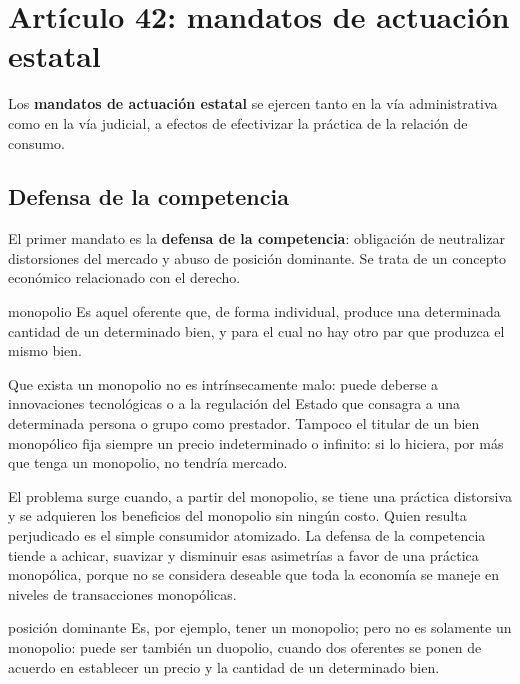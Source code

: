 \documentclass[12pt,oneside]{book}
\begin{document}
\chapter{Art\'iculo 42: mandatos de actuaci\'on estatal}

Los \textbf{mandatos de actuaci\'on estatal} se ejercen tanto en la v\'ia administrativa como en la v\'ia judicial, a efectos de efectivizar la pr\'actica de la relaci\'on de consumo.

\section{Defensa de la competencia}

El primer mandato es la \textbf{defensa de la competencia}: obligaci\'on de neutralizar distorsiones del mercado y abuso de posici\'on dominante. Se trata de un concepto econ\'omico relacionado con el derecho.

\begin{definition}{monopolio}
Es aquel oferente que, de forma individual, produce una determinada cantidad de un determinado bien, y para el cual no hay otro par que produzca el mismo bien.
\end{definition}

Que exista un monopolio no es intr\'insecamente malo: puede deberse a innovaciones tecnol\'ogicas o a la regulaci\'on del Estado que consagra a una determinada persona o grupo como prestador. Tampoco el titular de un bien monop\'olico fija siempre un precio indeterminado o infinito: si lo hiciera, por m\'as que tenga un monopolio, no tendr\'ia mercado.

El problema surge cuando, a partir del monopolio, se tiene una pr\'actica distorsiva y se adquieren los beneficios del monopolio sin ning\'un costo. Quien resulta perjudicado es el simple consumidor atomizado. La defensa de la competencia tiende a achicar, suavizar y disminuir esas asimetr\'ias a favor de una pr\'actica monop\'olica, porque no se considera deseable que toda la econom\'ia se maneje en niveles de transacciones monop\'olicas.

\begin{definition}{posici\'on dominante}
Es, por ejemplo, tener un monopolio; pero no es solamente un monopolio: puede ser tambi\'en un duopolio, cuando dos oferentes se ponen de acuerdo en establecer un precio y la cantidad de un determinado bien.
\end{definition}
\end{document}
